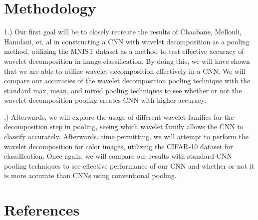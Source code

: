 \documentclass{article}
\begin{document}
\section{Methodology}
1.) Our first goal will be to closely recreate the results of Chaabane, Mellouli, Hamdani, et. al in constructing a CNN with wavelet decomposition as a pooling method, utilizing the MNIST dataset as a method to test effective accuracy of wavelet decomposition in image classification. By doing this, we will have shown that we are able to utilize wavelet decomposition effectively in a CNN. We will compare our accuracies of the wavelet decomposition pooling technique with the standard max, mean, and mixed pooling techniques to see whether or not the wavelet decomposition pooling creates CNN with higher accuracy. 
\newline

.) Afterwards, we will explore the usage of different wavelet families for the decomposition step in pooling, seeing which wavelet family allows the CNN to classify accurately.  Afterwards, time permitting, we will attempt to perform the wavelet decomposition for color images, utilizing the CIFAR-10 dataset for classification. Once again, we will compare our results with standard CNN pooling techniques to see effective performance of our CNN and whether or not it is more accurate than CNNs using conventional pooling. 

\section{References}
\end{document}

